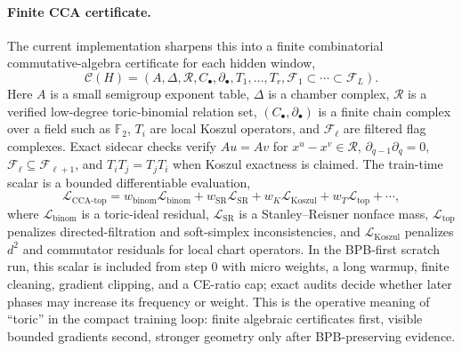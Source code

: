 \documentclass[10pt]{article}
\theoremstyle{definition}
\theoremstyle{plain}
\theoremstyle{remark}
\begin{document}
\paragraph{Finite CCA certificate.}
The current implementation sharpens this into a finite combinatorial commutative-algebra certificate for each hidden window,
\begin{equation}
  \mathcal C(H)=
  (A,\Delta,\mathcal R,C_\bullet,\partial_\bullet,
   T_1,\ldots,T_r,\mathcal F_1\subset\cdots\subset\mathcal F_L).
\end{equation}
Here $A$ is a small semigroup exponent table, $\Delta$ is a chamber complex, $\mathcal R$ is a verified low-degree toric-binomial relation set, $(C_\bullet,\partial_\bullet)$ is a finite chain complex over a field such as $\mathbb F_2$, $T_i$ are local Koszul operators, and $\mathcal F_\ell$ are filtered flag complexes.  Exact sidecar checks verify $Au=Av$ for $x^u-x^v\in\mathcal R$, $\partial_{q-1}\partial_q=0$, $\mathcal F_\ell\subseteq\mathcal F_{\ell+1}$, and $T_iT_j=T_jT_i$ when Koszul exactness is claimed.  The train-time scalar is a bounded differentiable evaluation,
\begin{equation}
  \mathcal L_{\mathrm{CCA}\text{-}\mathrm{top}}
  =
  w_{\mathrm{binom}}\mathcal L_{\mathrm{binom}}
  +w_{\mathrm{SR}}\mathcal L_{\mathrm{SR}}
  +w_K\mathcal L_{\mathrm{Koszul}}
  +w_T\mathcal L_{\mathrm{top}}+\cdots,
\end{equation}
where $\mathcal L_{\mathrm{binom}}$ is a toric-ideal residual, $\mathcal L_{\mathrm{SR}}$ is a Stanley--Reisner nonface mass, $\mathcal L_{\mathrm{top}}$ penalizes directed-filtration and soft-simplex inconsistencies, and $\mathcal L_{\mathrm{Koszul}}$ penalizes $d^2$ and commutator residuals for local chart operators.  In the BPB-first scratch run, this scalar is included from step $0$ with micro weights, a long warmup, finite cleaning, gradient clipping, and a CE-ratio cap; exact audits decide whether later phases may increase its frequency or weight.  This is the operative meaning of ``toric'' in the compact training loop: finite algebraic certificates first, visible bounded gradients second, stronger geometry only after BPB-preserving evidence.
\end{document}
